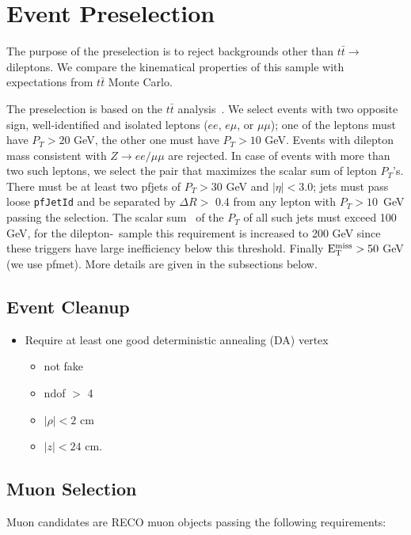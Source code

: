 \section{Event Preselection}
\label{sec:eventSel}
The purpose of the preselection is to reject backgrounds other than 
$t\bar{t} \to$ dileptons.  We compare the kinematical 
properties of this sample with expectations from $t\bar{t}$ 
Monte Carlo.

The preselection is based on the 
$t\bar{t}$ analysis~\cite{ref:top}.  
We select events with two opposite sign, well-identified and isolated
leptons ($ee$, $e\mu$, or $\mu\mu$); one of the leptons must 
have $P_T > 20$ GeV,
the other one must have $P_T > 10$ GeV. Events with dilepton mass
consistent with $Z \to ee/\mu\mu$ are rejected.
In case of events with 
more than two such leptons, we select the pair that maximizes the scalar 
sum of lepton $P_T$'s.
There must be at least two 
pfjets of $P_T > 30$ GeV and $|\eta| < 3.0$;  jets must pass
loose {\tt pfJetId} and be separated by $\Delta R >$ 0.4 from any 
lepton with $P_T > 10$~GeV passing the selection.
The scalar sum \Ht\ of the 
$P_T$ of all such jets must exceed 100 GeV, for the dilepton-\Ht\ sample
this requirement is increased to 200 GeV since these triggers have large inefficiency
below this threshold.
Finally $\rm E_{T}^{miss} > 50$ GeV (we use pfmet). More details are given in the subsections below.

\subsection{Event Cleanup}
\label{sec:cleanup}

\begin{itemize}
   \item Require at least one good deterministic annealing (DA) vertex
   \begin{itemize}
      \item not fake
      \item ndof $>$ 4
      \item $|\rho| < 2$ cm
      \item $|z| < 24$ cm.  
   \end{itemize}
\end{itemize}


\subsection{Muon Selection}
\label{sec:muon}

Muon candidates are RECO muon objects passing the following
requirements:

